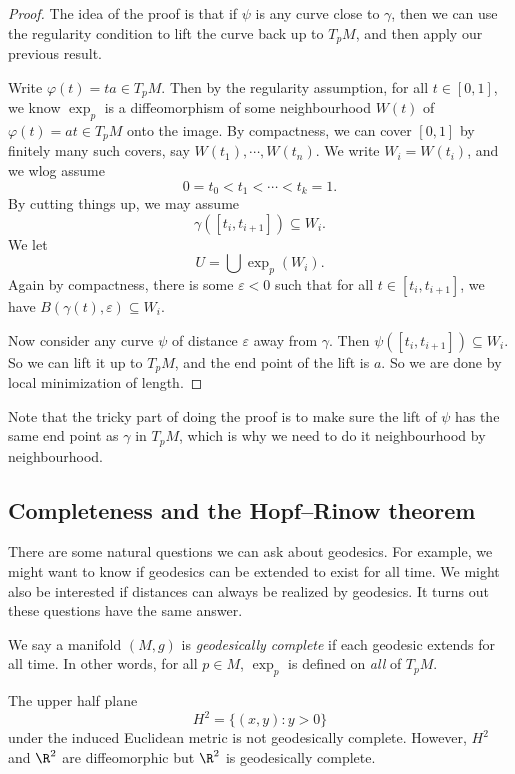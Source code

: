 \documentclass[a4paper]{article}
\begin{document}
\begin{proof}
  The idea of the proof is that if $\psi$ is any curve close to $\gamma$, then we can use the regularity condition to lift the curve back up to $T_p M$, and then apply our previous result.

  Write $\varphi(t) = ta \in T_p M$. Then by the regularity assumption, for all $t \in [0, 1]$, we know $\exp_p$ is a diffeomorphism of some neighbourhood $W(t)$ of $\varphi(t) = at \in T_p M$ onto the image. By compactness, we can cover $[0, 1]$ by finitely many such covers, say $W(t_1), \cdots, W(t_n)$. We write $W_i = W(t_i)$, and we wlog assume
  \[
    0 = t_0 < t_1 < \cdots < t_k = 1.
  \]
  By cutting things up, we may assume
  \[
    \gamma([t_i, t_{i + 1}]) \subseteq W_i.
  \]
  We let
  \[
    U = \bigcup \exp_p (W_i).
  \]
  Again by compactness, there is some $\varepsilon < 0$ such that for all $t \in [t_i, t_{i + 1}]$, we have $B(\gamma(t), \varepsilon) \subseteq W_i$.

  Now consider any curve $\psi$ of distance $\varepsilon$ away from $\gamma$. Then $\psi([t_i, t_{i + 1}]) \subseteq W_i$. So we can lift it up to $T_p M$, and the end point of the lift is $a$. So we are done by local minimization of length.
\end{proof}
Note that the tricky part of doing the proof is to make sure the lift of $\psi$ has the same end point as $\gamma$ in $T_p M$, which is why we need to do it neighbourhood by neighbourhood.

\subsection{Completeness and the Hopf--Rinow theorem}
There are some natural questions we can ask about geodesics. For example, we might want to know if geodesics can be extended to exist for all time. We might also be interested if distances can always be realized by geodesics. It turns out these questions have the same answer.

\begin{defi}
  We say a manifold $(M, g)$ is \emph{geodesically complete} if each geodesic extends for all time. In other words, for all $p \in M$, $\exp_p$ is defined on \emph{all} of $T_p M$.
\end{defi}

\begin{eg}
  The upper half plane
  \[
    H^2 = \{(x, y) : y> 0\}
  \]
  under the induced Euclidean metric is not geodesically complete. However, $H^2$ and $\R^2$ are diffeomorphic but $\R^2$ is geodesically complete.
\end{eg}
\end{document}
